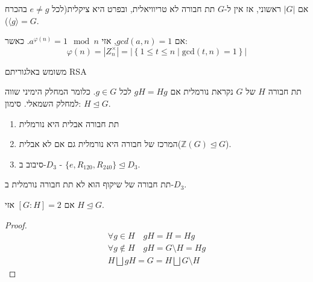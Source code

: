 \documentclass{tstextbook}
\begin{document}
\begin{corollary}
אם \(|G|\) ראשוני, אז אין ל-\(G\) תת חבורה לא טריוויאלית, ובפרט היא ציקלית(לכל \(e\neq g\) בהכרח \(\langle g\rangle=G\)).

\end{corollary}
\begin{theorem}[אוילר]
אם \(gcd(a,n)=1\), אזי \(a^{\varphi(n)}=1\mod n\). כאשר:
$$\varphi(n)=|Z_{n}^\times|=|\left\{  1\leq t\leq n \;\big|\;\mathrm{gcd}(t,n)=1  \right\}|$$

\end{theorem}
\begin{remark}
משומש באלגוריתם RSA

\end{remark}
\begin{definition}
תת חבורה \(H\) של \(G\) נקראת נורמלית אם \(gH=Hg\) לכל \(g \in G\). כלומר המחלק הימיני שווה למחלק השמאלי. 
סימון: \(H \trianglelefteq G\).

\end{definition}
\begin{example}
  \begin{enumerate}
    \item תת חבורה אבלית היא נורמלית 


    \item המרכז של חבורה היא נורמלית גם אם לא אבלית(\(\mathbb{Z}(G)\trianglelefteq G\)). 


    \item סיבוב ב-\(D_{3}\) - \(\{ e,R_{120},R_{240} \}\trianglelefteq D_{3}\). 


  \end{enumerate}
\end{example}
\begin{remark}
תת חבורה של שיקוף הוא לא תת חבורה נורמלית ב-\(D_{3}\).

\end{remark}
\begin{proposition}
אם \([G:H]=2\) אזי \(H\trianglelefteq G\). 

\end{proposition}
\begin{proof}
$$\begin{gather}\forall g \in H\quad  gH=H=Hg\\\forall g\notin H\quad  gH=G\setminus H=Hg \\H \bigsqcup gH=G=H  \bigsqcup G \setminus H
\end{gather}$$

\end{proof}
\end{document}
